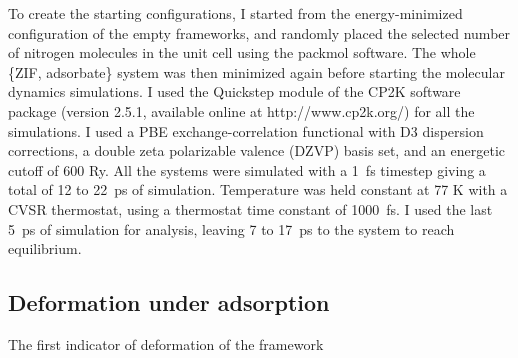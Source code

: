 \documentclass[thesis]{subfiles}
\begin{document}
To create the starting configurations, I started from the energy-minimized
configuration of the empty frameworks, and randomly placed the selected number
of nitrogen molecules in the unit cell using the packmol
software\cite{Martnez2009}.  The whole \{ZIF, adsorbate\} system was then
minimized again before starting the molecular dynamics simulations. I used the
Quickstep module\cite{VandeVondele2005} of the CP2K software package (version
2.5.1, available online at http://www.cp2k.org/) for all the simulations. I used
a PBE exchange-correlation functional with D3 dispersion corrections, a double
zeta polarizable valence (DZVP) basis set, and an energetic cutoff of 600 Ry.
All the systems were simulated with a \SI{1}{fs} timestep giving a total of 12
to \SI{22}{ps} of simulation. Temperature was held constant at 77 K with a CVSR
thermostat, using a thermostat time constant of \SI{1000}{fs}. I used the last
\SI{5}{ps} of simulation for analysis, leaving 7 to \SI{17}{ps} to the system to
reach equilibrium.

\subsection{Deformation under adsorption}

The first indicator of deformation of the framework

\begin{figure}[ht]
    \centering
    
    \caption{}
    \label{fig:zif8x-dihedrals}
\end{figure}
\end{document}
